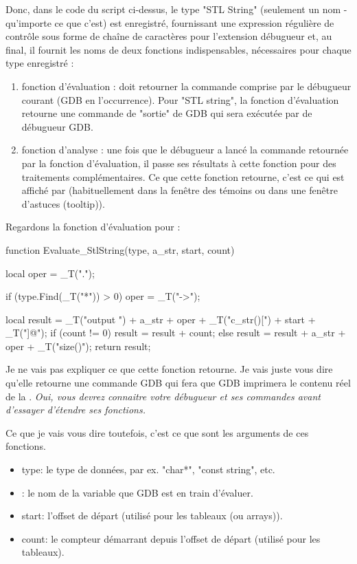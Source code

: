 Donc, dans le code du script ci-dessus, le type "STL String" (seulement un nom - qu'importe ce que c'est) est enregistré, fournissant une expression régulière de contrôle sous forme de chaîne de caractères pour l'extension débugueur et, au final, il fournit les noms de deux fonctions indispensables, nécessaires pour chaque type enregistré :

\begin{enumerate}
\item fonction d'évaluation : doit retourner la commande comprise par le débugueur courant (GDB en l'occurrence). Pour "STL string", la fonction d'évaluation retourne une commande de "sortie" de GDB qui sera exécutée par de débugueur GDB.
\item fonction d'analyse : une fois que le débugueur a lancé la commande retournée par la fonction d'évaluation, il passe ses résultats à cette fonction pour des traitements complémentaires. Ce que cette fonction retourne, c'est ce qui est affiché par \codeblocks (habituellement dans la fenêtre des témoins ou dans une fenêtre d'astuces (tooltip)).
\end{enumerate}


Regardons la fonction d'évaluation pour :

\begin{code}
function Evaluate_StlString(type, a_str, start, count)
{
    local oper = _T(".");

    if (type.Find(_T("*")) > 0)
        oper = _T("->");

    local result = _T("output ") + a_str + oper + _T("c_str()[") + start + _T("]@");
    if (count != 0)
        result = result + count;
    else
        result = result + a_str + oper + _T("size()");
    return result;
}
\end{code}

Je ne vais pas expliquer ce que cette fonction retourne. Je vais juste vous dire qu'elle retourne une commande GDB qui fera que GDB imprimera le contenu réel de la . \textit{Oui, vous devrez connaitre votre débugueur et ses commandes avant d'essayer d'étendre ses fonctions.}

Ce que je vais vous dire toutefois, c'est ce que sont les arguments de ces fonctions.

\begin{itemize}
\item type: le type de données, par ex. "char*", "const string", etc.
\item {}: le nom de la variable que GDB est en train d'évaluer.
\item start: l'offset de départ (utilisé pour les tableaux (ou arrays)).
\item count: le compteur démarrant depuis l'offset de départ (utilisé pour les tableaux).
\end{itemize}

